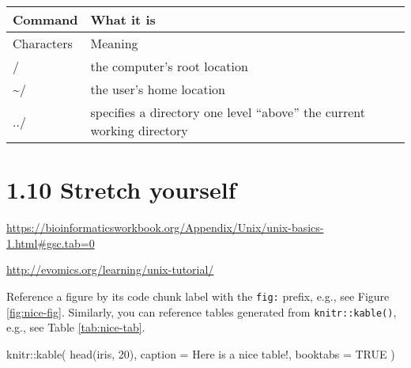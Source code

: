 \documentclass[
]{book}
\newenvironment{Shaded}{\begin{snugshade}}{\end{snugshade}}
\newcommand{\AttributeTok}[1]{\textcolor[rgb]{0.77,0.63,0.00}{#1}}
\newcommand{\ConstantTok}[1]{\textcolor[rgb]{0.00,0.00,0.00}{#1}}
\newcommand{\DecValTok}[1]{\textcolor[rgb]{0.00,0.00,0.81}{#1}}
\newcommand{\FunctionTok}[1]{\textcolor[rgb]{0.00,0.00,0.00}{#1}}
\newcommand{\NormalTok}[1]{#1}
\newcommand{\SpecialCharTok}[1]{\textcolor[rgb]{0.00,0.00,0.00}{#1}}
\newcommand{\StringTok}[1]{\textcolor[rgb]{0.31,0.60,0.02}{#1}}
\begin{document}
\begin{longtable}{ll}
\toprule
\textbf{Command} & \textbf{What it is}\\
\midrule
Characters & Meaning\\
/ & the computer’s root location\\
\textasciitilde{}/ & the user’s home location\\
../ & specifies a directory one level “above” the current working directory\\
\bottomrule
\end{longtable}

\hypertarget{stretch-yourself}{%
\section{1.10 Stretch yourself}\label{stretch-yourself}}

\url{https://bioinformaticsworkbook.org/Appendix/Unix/unix-basics-1.html\#gsc.tab=0}

\url{http://evomics.org/learning/unix-tutorial/}

Reference a figure by its code chunk label with the \texttt{fig:} prefix, e.g., see Figure \ref{fig:nice-fig}. Similarly, you can reference tables generated from \texttt{knitr::kable()}, e.g., see Table \ref{tab:nice-tab}.

\begin{Shaded}
\begin{Highlighting}[]
\NormalTok{knitr}\SpecialCharTok{::}\FunctionTok{kable}\NormalTok{(}
  \FunctionTok{head}\NormalTok{(iris, }\DecValTok{20}\NormalTok{), }\AttributeTok{caption =} \StringTok{\textquotesingle{}Here is a nice table!\textquotesingle{}}\NormalTok{,}
  \AttributeTok{booktabs =} \ConstantTok{TRUE}
\NormalTok{)}
\end{Highlighting}
\end{Shaded}
\end{document}
